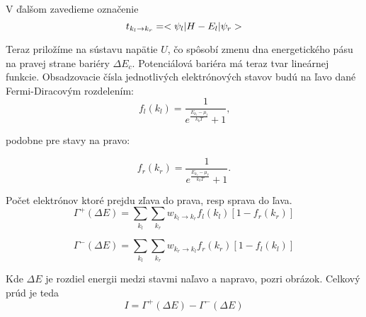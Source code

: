 V ďalšom zavedieme označenie
\begin{equation}
\label{eq:02t}
t_{k_l \to k_r}=<\psi_l|H-E_l|\psi_r>
\end{equation}

Teraz priložíme na sústavu napätie $U$, čo spôsobí zmenu dna energetického pásu na 
pravej strane bariéry $\Delta E_c$.  Potenciálová bariéra má teraz tvar lineárnej funkcie.
Obsadzovacie čísla jednotlivých elektrónových stavov budú na ľavo dané Fermi-Diracovým rozdelením:
\begin{equation}
 \label{eq:02fermidirac_left}
 f_l(k_l)=\frac{1}{e^{\frac{E_{k_l}-\mu_l}{k_bT}}+1}\text{,}
\end{equation} 

podobne pre stavy na pravo:

\begin{equation}
 \label{eq:02fermidirac_right}
 f_r(k_r)=\frac{1}{e^{\frac{E_{k_r}-\mu_r}{k_bT}}+1}\text{.}
\end{equation} 

Počet elektrónov ktoré prejdu zľava do prava, resp sprava do ľava.
\begin{equation}
\label{eq:02elctronsLTR}
\Gamma^+(\Delta E)=\sum_{k_l}{\sum_{k_r} w_{k_l \to k_r} f_l(k_l)[1-f_r(k_r)]}
\end{equation}

\begin{equation}
\label{eq:02elctronsRTL}
\Gamma^-(\Delta E)=\sum_{k_l}{\sum_{k_r} w_{k_r \to k_l} f_r(k_r)[1-f_l(k_l)]}
\end{equation}

Kde $\Delta E$ je rozdiel energii medzi stavmi naľavo a napravo, pozri obrázok. Celkový prúd je teda 
\begin{equation}
\label{eq:02current}
I={\Gamma^+(\Delta E) - \Gamma^-(\Delta E)}
\end{equation}


